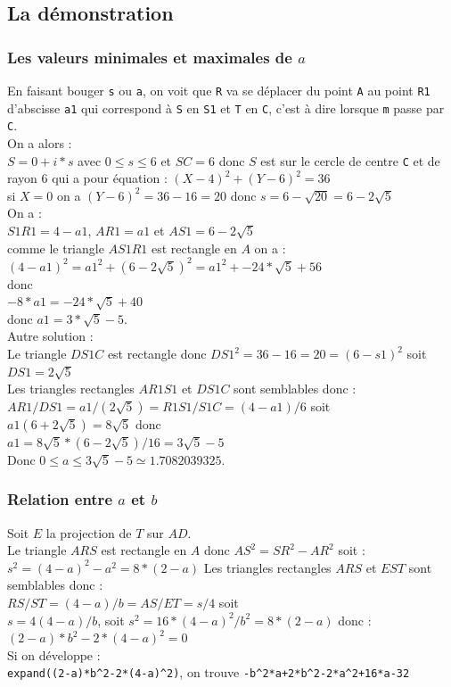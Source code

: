 \documentclass[a4paper,11pt]{book}
\begin{document}
\subsection{La d\'emonstration}
\subsubsection{Les valeurs minimales et maximales de $a$}
En faisant bouger {\tt s} ou {\tt a}, on voit que {\tt R} va se d\'eplacer du 
point {\tt A}
 au point {\tt R1} d'abscisse {\tt a1} qui correspond \`a {\tt S} en {\tt S1}
et {\tt T} en {\tt C}, c'est \`a dire lorsque {\tt m} passe par {\tt C}.\\ 
On a alors :\\
$S=0+i*s$ avec $0 \leq s \leq 6$ et $SC=6$ donc $S$ est sur le cercle de centre
{\tt C} et de rayon 6 qui a pour \'equation : $(X-4)^2+(Y-6)^2=36$\\
si $X=0$ on a $(Y-6)^2=36-16=20$ donc $s=6-\sqrt{20}=6-2\sqrt 5$\\
On a :\\
$S1R1=4-a1$, $AR1=a1$ et $AS1=6-2\sqrt 5$\\
comme le triangle $AS1R1$ est rectangle en $A$ on a :\\
$(4-a1)^2=a1^2+(6-2\sqrt 5)^2=a1^2+-24*\sqrt 5+56$\\
donc\\
$-8*a1=-24*\sqrt 5+40$\\
donc $a1=3*\sqrt 5-5$.\\
Autre solution :\\
Le triangle $DS1C$ est rectangle donc $DS1^2=36-16=20=(6-s1)^2$ soit 
$DS1=2\sqrt 5$\\
Les triangles rectangles $AR1S1$ et $DS1C$ sont semblables donc :\\
$AR1/DS1=a1/(2\sqrt 5)=R1S1/S1C=(4-a1)/6$ soit\\
$a1(6+2\sqrt 5)=8\sqrt 5$ donc\\
$a1=8\sqrt 5*(6-2\sqrt 5)/16=3\sqrt 5-5$\\
Donc $0 \leq a \leq 3\sqrt 5-5 \simeq 1.7082039325$.\\

\subsubsection{Relation entre $a$ et $b$}
Soit $E$ la projection de $T$ sur $AD$.\\
Le triangle $ARS$ est rectangle en $A$ donc $AS^2=SR^2-AR^2$ soit :\\
$s^2=(4-a)^2-a^2=8*(2-a)$
Les triangles rectangles $ARS$ et $EST$ sont semblables donc :\\
$RS/ST=(4-a)/b=AS/ET=s/4$ soit\\
$s=4(4-a)/b$, soit $s^2=16*(4-a)^2/b^2=8*(2-a)$ donc :\\
$(2-a)*b^2-2*(4-a)^2=0$\\
Si on d\'eveloppe :\\
{\tt expand((2-a)*b\verb|^|2-2*(4-a)\verb|^|2)}, on trouve
{\tt -b\verb|^|2*a+2*b\verb|^|2-2*a\verb|^|2+16*a-32}
\end{document}
